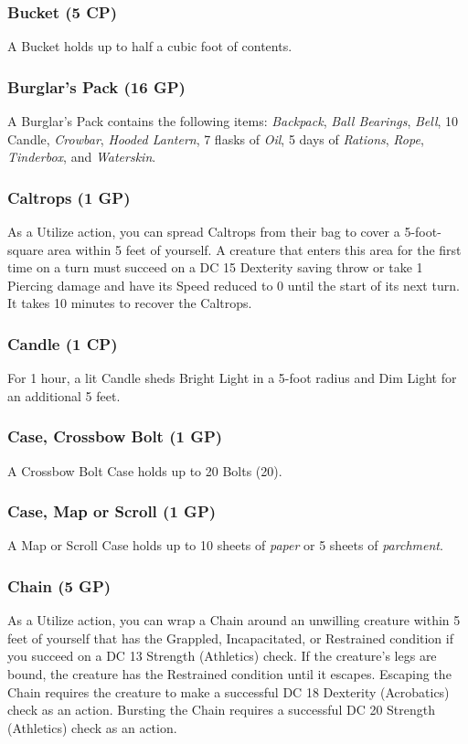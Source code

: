 \documentclass[10pt,a4paper,twoside,bg=print,twocolumn,openany,nodeprecatedcode]{dndbook}
\begin{document}
\subsubsection{Bucket (5 CP)}
A Bucket holds up to half a cubic foot of contents.

\subsubsection{Burglar's Pack (16 GP)}
A Burglar's Pack contains the following items: \textit{Backpack}, \textit{Ball Bearings}, \textit{Bell}, 10 Candle, \textit{Crowbar}, \textit{Hooded Lantern}, 7 flasks of \textit{Oil}, 5 days of \textit{Rations}, \textit{Rope}, \textit{Tinderbox}, and \textit{Waterskin}.

\subsubsection{Caltrops (1 GP)}
As a Utilize action, you can spread Caltrops from their bag to cover a 5-foot-square area within 5 feet of yourself. A creature that enters this area for the first time on a turn must succeed on a DC 15 Dexterity saving throw or take 1 Piercing damage and have its Speed reduced to 0 until the start of its next turn. It takes 10 minutes to recover the Caltrops.

\subsubsection{Candle (1 CP)}
For 1 hour, a lit Candle sheds Bright Light in a 5-foot radius and Dim Light for an additional 5 feet.

\subsubsection{Case, Crossbow Bolt (1 GP)}
A Crossbow Bolt Case holds up to 20 Bolts (20).

\subsubsection{Case, Map or Scroll (1 GP)}
A Map or Scroll Case holds up to 10 sheets of \textit{paper} or 5 sheets of \textit{parchment}.

\subsubsection{Chain (5 GP)}
As a Utilize action, you can wrap a Chain around an unwilling creature within 5 feet of yourself that has the Grappled, Incapacitated, or Restrained condition if you succeed on a DC 13 Strength (Athletics) check. If the creature's legs are bound, the creature has the Restrained condition until it escapes. Escaping the Chain requires the creature to make a successful DC 18 Dexterity (Acrobatics) check as an action. Bursting the Chain requires a successful DC 20 Strength (Athletics) check as an action.
\end{document}
